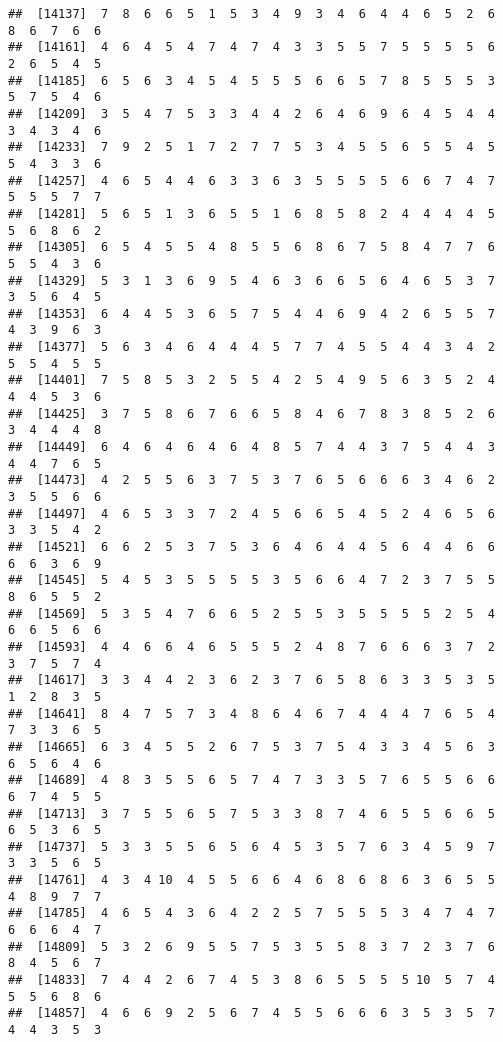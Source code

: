 \documentclass[
]{book}
\begin{document}
\begin{verbatim}
##  [14137]  7  8  6  6  5  1  5  3  4  9  3  4  6  4  4  6  5  2  6  8  6  7  6  6
##  [14161]  4  6  4  5  4  7  4  7  4  3  3  5  5  7  5  5  5  5  6  2  6  5  4  5
##  [14185]  6  5  6  3  4  5  4  5  5  5  6  6  5  7  8  5  5  5  3  5  7  5  4  6
##  [14209]  3  5  4  7  5  3  3  4  4  2  6  4  6  9  6  4  5  4  4  3  4  3  4  6
##  [14233]  7  9  2  5  1  7  2  7  7  5  3  4  5  5  6  5  5  4  5  5  4  3  3  6
##  [14257]  4  6  5  4  4  6  3  3  6  3  5  5  5  5  6  6  7  4  7  5  5  5  7  7
##  [14281]  5  6  5  1  3  6  5  5  1  6  8  5  8  2  4  4  4  4  5  5  6  8  6  2
##  [14305]  6  5  4  5  5  4  8  5  5  6  8  6  7  5  8  4  7  7  6  5  5  4  3  6
##  [14329]  5  3  1  3  6  9  5  4  6  3  6  6  5  6  4  6  5  3  7  3  5  6  4  5
##  [14353]  6  4  4  5  3  6  5  7  5  4  4  6  9  4  2  6  5  5  7  4  3  9  6  3
##  [14377]  5  6  3  4  6  4  4  4  5  7  7  4  5  5  4  4  3  4  2  5  5  4  5  5
##  [14401]  7  5  8  5  3  2  5  5  4  2  5  4  9  5  6  3  5  2  4  4  4  5  3  6
##  [14425]  3  7  5  8  6  7  6  6  5  8  4  6  7  8  3  8  5  2  6  3  4  4  4  8
##  [14449]  6  4  6  4  6  4  6  4  8  5  7  4  4  3  7  5  4  4  3  4  4  7  6  5
##  [14473]  4  2  5  5  6  3  7  5  3  7  6  5  6  6  6  3  4  6  2  3  5  5  6  6
##  [14497]  4  6  5  3  3  7  2  4  5  6  6  5  4  5  2  4  6  5  6  3  3  5  4  2
##  [14521]  6  6  2  5  3  7  5  3  6  4  6  4  4  5  6  4  4  6  6  6  6  3  6  9
##  [14545]  5  4  5  3  5  5  5  5  3  5  6  6  4  7  2  3  7  5  5  8  6  5  5  2
##  [14569]  5  3  5  4  7  6  6  5  2  5  5  3  5  5  5  5  2  5  4  6  6  5  6  6
##  [14593]  4  4  6  6  4  6  5  5  5  2  4  8  7  6  6  6  3  7  2  3  7  5  7  4
##  [14617]  3  3  4  4  2  3  6  2  3  7  6  5  8  6  3  3  5  3  5  1  2  8  3  5
##  [14641]  8  4  7  5  7  3  4  8  6  4  6  7  4  4  4  7  6  5  4  7  3  3  6  5
##  [14665]  6  3  4  5  5  2  6  7  5  3  7  5  4  3  3  4  5  6  3  6  5  6  4  6
##  [14689]  4  8  3  5  5  6  5  7  4  7  3  3  5  7  6  5  5  6  6  6  7  4  5  5
##  [14713]  3  7  5  5  6  5  7  5  3  3  8  7  4  6  5  5  6  6  5  6  5  3  6  5
##  [14737]  5  3  3  5  5  6  5  6  4  5  3  5  7  6  3  4  5  9  7  3  3  5  6  5
##  [14761]  4  3  4 10  4  5  5  6  6  4  6  8  6  8  6  3  6  5  5  4  8  9  7  7
##  [14785]  4  6  5  4  3  6  4  2  2  5  7  5  5  5  3  4  7  4  7  6  6  6  4  7
##  [14809]  5  3  2  6  9  5  5  7  5  3  5  5  8  3  7  2  3  7  6  8  4  5  6  7
##  [14833]  7  4  4  2  6  7  4  5  3  8  6  5  5  5  5 10  5  7  4  5  5  6  8  6
##  [14857]  4  6  6  9  2  5  6  7  4  5  5  6  6  6  3  5  3  5  7  4  4  3  5  3

\end{verbatim}
\end{document}
